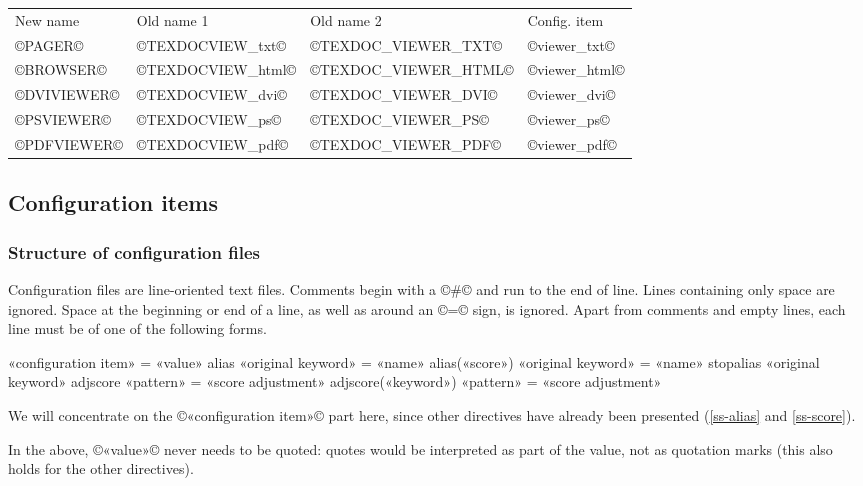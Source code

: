 \documentclass[a4paper, oneside]{scrartcl}
\makeatletter
\newenvironment{htcode}{%
  \SaveVerbatim[samepage, gobble=2]{verbmat}%
  }{%
  \endSaveVerbatim
  \par\medskip\noindent\hspace*{\parindent}%
  \BUseVerbatim{verbmat}%
  \par\medskip\@endpetrue}
\makeatother
\begin{document}
\begin{center}
  \begin{tabular}{*4l}
    New name    & Old name 1        & Old name 2           & Config. item  \\
    ©PAGER©     & ©TEXDOCVIEW_txt©  & ©TEXDOC_VIEWER_TXT©  & ©viewer_txt©  \\
    ©BROWSER©   & ©TEXDOCVIEW_html© & ©TEXDOC_VIEWER_HTML© & ©viewer_html© \\
    ©DVIVIEWER© & ©TEXDOCVIEW_dvi©  & ©TEXDOC_VIEWER_DVI©  & ©viewer_dvi©  \\
    ©PSVIEWER©  & ©TEXDOCVIEW_ps©   & ©TEXDOC_VIEWER_PS©   & ©viewer_ps©   \\
    ©PDFVIEWER© & ©TEXDOCVIEW_pdf©  & ©TEXDOC_VIEWER_PDF©  & ©viewer_pdf©  \\
  \end{tabular}
\end{center}

\subsection{Configuration items}\label{ss-conf}

\subsubsection{Structure of configuration files}\label{sss-sonf-struct}

Configuration files are line-oriented text files. Comments begin with a ©#©
and run to the end of line. Lines containing only space are ignored. Space at
the beginning or end of a line, as well as around an ©=© sign, is ignored.
Apart from comments and empty lines, each line must be of one of the following
forms.

\begin{htcode}
  «configuration item» = «value»
  alias «original keyword» = «name»
  alias(«score») «original keyword» = «name»
  stopalias «original keyword»
  adjscore «pattern» = «score adjustment»
  adjscore(«keyword») «pattern» = «score adjustment»
\end{htcode}

We will concentrate on the ©«configuration item»© part here, since other
directives have already been presented (\ref{ss-alias} and \ref{ss-score}).

In the above, ©«value»©  never needs to be quoted: quotes would be interpreted
as part of the value, not as quotation marks (this also holds for the other
directives).
\end{document}
